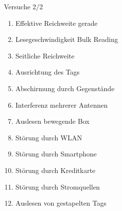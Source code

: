 \documentclass{beamer}
\begin{document}
\begin{frame}{Versuche 2/2}
\begin{enumerate}
    \item Effektive Reichweite gerade
    \item Lesegeschwindigkeit Bulk Reading
    \item Seitliche Reichweite
    \item Ausrichtung des Tags
    \item Abschirmung durch Gegenstände
    \item Interferenz mehrerer Antennen
    \item Auslesen bewegende Box
    \item Störung durch WLAN
    \item Störung durch Smartphone
    \item Störung durch Kreditkarte
    \item Störung durch Stromquellen
    \item Auslesen von gestapelten Tags
\end{enumerate}
\end{frame}
\end{document}
